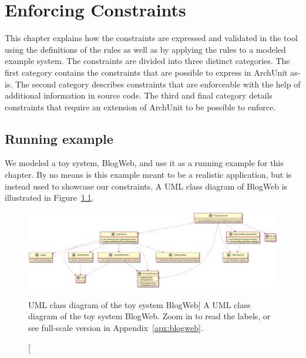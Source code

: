 \chapter{Enforcing Constraints}
\label{ch:enforcing_constraints}

This chapter explains how the constraints are expressed and validated in the tool using the definitions of the rules as well as by applying the rules to a modeled example system. The constraints are divided into three distinct categories. The first category contains the constraints that are possible to express in ArchUnit as-is. The second category describes constraints that are enforceable with the help of additional information in source code. The third and final category details constraints that require an extension of ArchUnit to be possible to enforce.

\section{Running example}
We modeled a toy system, BlogWeb, and use it as a running example for this chapter. By no means is this example meant to be a realistic application, but is instead used to showcase our constraints.
A UML class diagram of BlogWeb is illustrated in Figure~\ref{fig:toy_application}.


\begin{figure}
    \centering
    \includegraphics[width=\textwidth]{figure/ToyApp.png}
    \caption
        [UML class diagram of the toy system BlogWeb]
        {A UML class diagram of the toy system BlogWeb. Zoom in to read the labels, or see full-scale version in Appendix~\ref{apx:blogweb}.}
    \label{fig:toy_application}
\end{figure}

